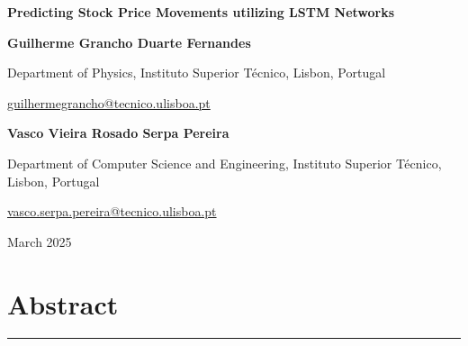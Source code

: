 \documentclass[10pt,a4paper]{article}
\begin{document}
\begin{titlepage}
    \centering
    \vspace*{\fill} %
    {\LARGE\bfseries Predicting Stock Price Movements utilizing LSTM Networks\par}
    \vspace{1cm} %
    \vspace{2cm}
    {\Large\bfseries Guilherme Grancho Duarte Fernandes\par}
    \vspace{0.5cm} %
    {\large Department of Physics, Instituto Superior Técnico, Lisbon, Portugal\par}
    {\large \href{mailto:guilhermegrancho@tecnico.ulisboa.pt}{guilhermegrancho@tecnico.ulisboa.pt}\par}
    \vspace{1cm} %
    {\Large\bfseries Vasco Vieira Rosado Serpa Pereira\par}
    \vspace{0.5cm}
    {\large Department of Computer Science and Engineering, Instituto Superior Técnico, Lisbon, Portugal\par}
    {\large \href{mailto:talles@ufop.edu.br}{vasco.serpa.pereira@tecnico.ulisboa.pt}\par}
    \vspace{3cm} %
    {\large March 2025\par}
    \vspace*{\fill} %
\end{titlepage}


\newpage

\section*{Abstract}

\noindent\rule{\textwidth}{1pt}
\vspace{0.1mm}
\end{document}

